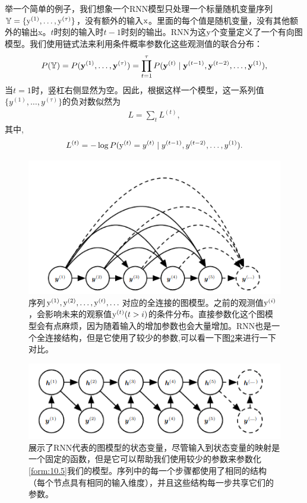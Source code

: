 举一个简单的例子，我们想象一个RNN模型只处理一个标量随机变量序列$ \mathbb{Y} = \{\mathrm{y}^{(1)},\dots,\mathrm{y}^{(\tau)}\}$，没有额外的输入$\mathrm{x}$。里面的每个值是随机变量，没有其他额外的输出x。$t$时刻的输入时$t-1$时刻的输出。RNN为这$\mathrm{y}$个变量定义了一个有向图模型。我们使用链式法来利用条件概率参数化这些观测值的联合分布：
\begin{align}
 P(\mathbb{Y}) = P(\mathbf{y}^{(1)},\dots,\mathbf{y}^{(\tau)}) = \prod_{t=1}^{\tau}P(\mathbf{y}^{(t)} \mid \mathbf{y}^{(t-1)},\mathbf{y}^{(t-2)},
 \dots,\mathbf{y}^{(1)}),
\end{align}
当$t=1$时，竖杠右侧显然为空。因此，根据这样一个模型，这一系列值$\{y^{(1)},\dots,y^{(\tau)} \}$的负对数似然为
\begin{align}
 L = \sum_{t} L^{(t)},
\end{align}
其中, 
\begin{align}
 L^{(t)} = -\log P(\mathrm{y}^{(t)} = y^{(t)} \mid y^{(t-1)},y^{(t-2)}, \dots, y^{(1)}).
\end{align}

\begin{figure}[htbp] %
   \centering
   \includegraphics[width=6in]{fig/chap10/10_7.PNG} 
   \caption{ 序列$\mathrm{y}^{(1)},\mathrm{y}^{(2)},\dots,\mathrm{y}^{(t)},\dots$对应的全连接的图模型。之前的观测值$\mathrm{y}^{(i)}$，会影响未来的观察值$\mathrm{y}^{(t)}(t>i)$的条件分布。直接参数化这个图模型会有点麻烦，因为随着输入的增加参数也会大量增加。RNN也是一个全连接结构，但是它使用了较少的参数,可以看一下图\ref{fig:10_8}来进行一下对比。}
   \label{fig:10_7}
\end{figure}

\begin{figure}[htbp] %
   \centering
   \includegraphics[width=6in]{fig/chap10/10_8.PNG} 
   \caption{ 展示了RNN代表的图模型的状态变量，尽管输入到状态变量的映射是一个固定的函数，但是它可以帮助我们使用较少的参数来参数化\ref{form:10.5}我们的模型。序列中的每一个步骤都使用了相同的结构（每个节点具有相同的输入维度），并且这些结构每一步共享它们的参数。}
   \label{fig:10_8}
\end{figure}

